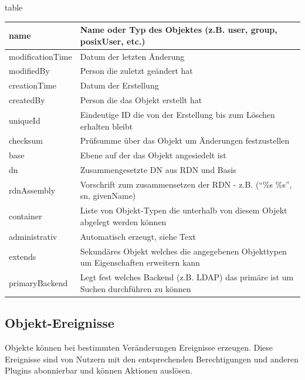 \begin{nofloat}{table}
 \begin{center}
  \begin{tabularx}{\textwidth}[]{|X|X|}
   \hline
   name    & Name oder Typ des Objektes (z.B. user, group, posixUser, etc.)\\
   \hline
   modificationTime    & Datum der letzten Änderung\\
   \hline
   modifiedBy      & Person die zuletzt geändert hat\\
   \hline
   creationTime    & Datum der Erstellung\\
   \hline
   createdBy       & Person die das Objekt erstellt hat\\
   \hline
   uniqueId        & Eindeutige ID die von der Erstellung bis zum Löschen erhalten bleibt\\
   \hline
   checksum        & Prüfsumme über das Objekt um Änderungen festzustellen\\
   \hline
   base            & Ebene auf der das Objekt angesiedelt ist\\
   \hline
   dn              & Zusammengesetzte DN aus RDN und Basis\\
   \hline
   rdnAssembly     & Vorschrift zum zusammensetzen der RDN - z.B. (``\%s \%s'', sn, givenName)\\
   \hline
   container       & Liste von Objekt-Typen die unterhalb von diesem Objekt abgelegt werden können\\
   \hline
   administrativ   & Automatisch erzeugt, siehe Text\\
   \hline
   extends         & Sekundäres Objekt welches die angegebenen Objekttypen um Eigenschaften erweitern kann\\
   \hline
   primaryBackend  & Legt fest welches Backend (z.B. LDAP) das primäre ist um Suchen durchführen zu können\\
   \hline
  \end{tabularx}
 \end{center}
\end{nofloat}

\subsection{Objekt-Ereignisse} 

Objekte können bei bestimmten Veränderungen Ereignisse erzeugen. Diese Ereignisse
sind von Nutzern mit den entsprechenden Berechtigungen und anderen Plugins abonnierbar und
können Aktionen auslösen.

